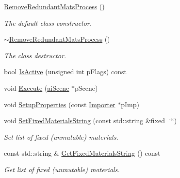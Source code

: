 \begin{DoxyCompactItemize}
\item 
\hypertarget{class_assimp_1_1_remove_redundant_mats_process_a3a90692df1fd2cd271bf946dbf8f8bd3}{\hyperlink{class_assimp_1_1_remove_redundant_mats_process_a3a90692df1fd2cd271bf946dbf8f8bd3}{Remove\+Redundant\+Mats\+Process} ()}\label{class_assimp_1_1_remove_redundant_mats_process_a3a90692df1fd2cd271bf946dbf8f8bd3}

\begin{DoxyCompactList}\small\item\em The default class constructor. \end{DoxyCompactList}\item 
\hypertarget{class_assimp_1_1_remove_redundant_mats_process_a0c269d9fa14ea5cfa30228694ae6f9fd}{\hyperlink{class_assimp_1_1_remove_redundant_mats_process_a0c269d9fa14ea5cfa30228694ae6f9fd}{$\sim$\+Remove\+Redundant\+Mats\+Process} ()}\label{class_assimp_1_1_remove_redundant_mats_process_a0c269d9fa14ea5cfa30228694ae6f9fd}

\begin{DoxyCompactList}\small\item\em The class destructor. \end{DoxyCompactList}\item 
bool \hyperlink{class_assimp_1_1_remove_redundant_mats_process_a9cd5584f1a821b7c02607dde5ccc6981}{Is\+Active} (unsigned int p\+Flags) const 
\item 
void \hyperlink{class_assimp_1_1_remove_redundant_mats_process_a5b3c0e23f7aac0ca5685e6078456b622}{Execute} (\hyperlink{structai_scene}{ai\+Scene} $\ast$p\+Scene)
\item 
void \hyperlink{class_assimp_1_1_remove_redundant_mats_process_a60549eb9ba3b1833355af4216cd820b1}{Setup\+Properties} (const \hyperlink{class_assimp_1_1_importer}{Importer} $\ast$p\+Imp)
\item 
void \hyperlink{class_assimp_1_1_remove_redundant_mats_process_a8d16761f288d33d4c5d8071c72cc7e24}{Set\+Fixed\+Materials\+String} (const std\+::string \&fixed=\char`\"{}\char`\"{})
\begin{DoxyCompactList}\small\item\em Set list of fixed (unmutable) materials. \end{DoxyCompactList}\item 
const std\+::string \& \hyperlink{class_assimp_1_1_remove_redundant_mats_process_acb0f924938a9eae50ef71ea0096ae834}{Get\+Fixed\+Materials\+String} () const 
\begin{DoxyCompactList}\small\item\em Get list of fixed (unmutable) materials. \end{DoxyCompactList}\end{DoxyCompactItemize}
